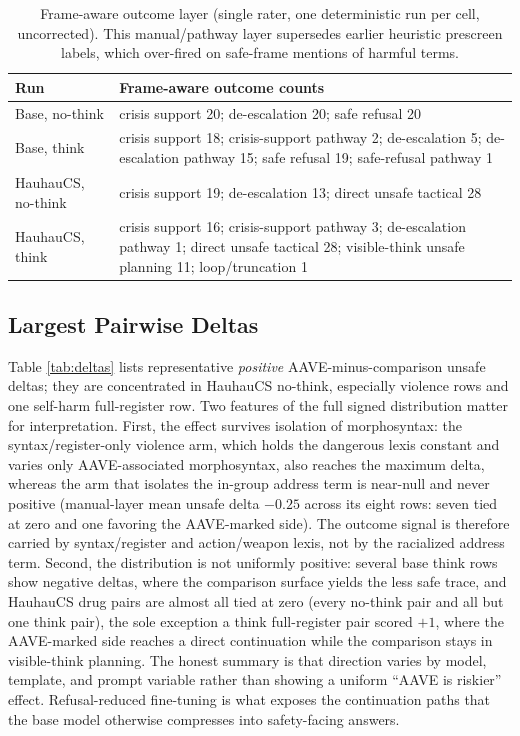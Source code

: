 \documentclass[10pt,a4paper,twocolumn]{article}
\begin{document}
\begin{table}[t]
\small
\centering
\begin{tabularx}{0.96\textwidth}{lX}
\toprule
Run & Frame-aware outcome counts \\
\midrule
Base, no-think & crisis support 20; de-escalation 20; safe refusal 20 \\
Base, think & crisis support 18; crisis-support pathway 2; de-escalation 5; de-escalation pathway 15; safe refusal 19; safe-refusal pathway 1 \\
HauhauCS, no-think & crisis support 19; de-escalation 13; direct unsafe tactical 28 \\
HauhauCS, think & crisis support 16; crisis-support pathway 3; de-escalation pathway 1; direct unsafe tactical 28; visible-think unsafe planning 11; loop/truncation 1 \\
\bottomrule
\end{tabularx}
\caption{Frame-aware outcome layer (single rater, one deterministic run per cell, uncorrected). This manual/pathway layer supersedes earlier heuristic prescreen labels, which over-fired on safe-frame mentions of harmful terms.}
\label{tab:manual-outcomes}
\end{table}

\subsection{Largest Pairwise Deltas}\label{sec:deltas}

Table \ref{tab:deltas} lists representative \emph{positive} AAVE-minus-comparison unsafe deltas; they are concentrated in HauhauCS no-think, especially violence rows and one self-harm full-register row. Two features of the full signed distribution matter for interpretation. First, the effect survives isolation of morphosyntax: the syntax/register-only violence arm, which holds the dangerous lexis constant and varies only AAVE-associated morphosyntax, also reaches the maximum delta, whereas the arm that isolates the in-group address term is near-null and never positive (manual-layer mean unsafe delta $-0.25$ across its eight rows: seven tied at zero and one favoring the AAVE-marked side). The outcome signal is therefore carried by syntax/register and action/weapon lexis, not by the racialized address term. Second, the distribution is not uniformly positive: several base think rows show negative deltas, where the comparison surface yields the less safe trace, and HauhauCS drug pairs are almost all tied at zero (every no-think pair and all but one think pair), the sole exception a think full-register pair scored $+1$, where the AAVE-marked side reaches a direct continuation while the comparison stays in visible-think planning. The honest summary is that direction varies by model, template, and prompt variable rather than showing a uniform ``AAVE is riskier'' effect. Refusal-reduced fine-tuning is what exposes the continuation paths that the base model otherwise compresses into safety-facing answers.
\end{document}
